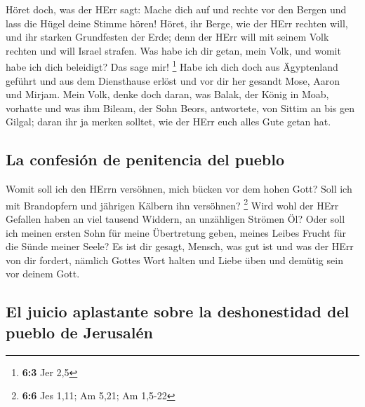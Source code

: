  Höret doch, was der HErr sagt: Mache dich auf und rechte
vor den Bergen und lass die Hügel deine Stimme hören! 
Höret, ihr Berge, wie der HErr rechten will, und ihr starken Grundfesten
der Erde; denn der HErr will mit seinem Volk rechten und will Israel
strafen.  Was habe ich dir getan, mein Volk, und womit
habe ich dich beleidigt? Das sage mir! \footnote{\textbf{6:3} Jer 2,5}
 Habe ich dich doch aus Ägyptenland geführt und aus dem
Diensthause erlöst und vor dir her gesandt Mose, Aaron und Mirjam.
 Mein Volk, denke doch daran, was Balak, der König in
Moab, vorhatte und was ihm Bileam, der Sohn Beors, antwortete, von
Sittim an bis gen Gilgal; daran ihr ja merken solltet, wie der HErr euch
alles Gute getan hat.

\hypertarget{la-confesiuxf3n-de-penitencia-del-pueblo}{%
\subsection{La confesión de penitencia del
pueblo}\label{la-confesiuxf3n-de-penitencia-del-pueblo}}

 Womit soll ich den HErrn versöhnen, mich bücken vor dem
hohen Gott? Soll ich mit Brandopfern und jährigen Kälbern ihn versöhnen?
\footnote{\textbf{6:6} Jes 1,11; Am 5,21; Am 1,5-22}  Wird
wohl der HErr Gefallen haben an viel tausend Widdern, an unzähligen
Strömen Öl? Oder soll ich meinen ersten Sohn für meine Übertretung
geben, meines Leibes Frucht für die Sünde meiner Seele? 
Es ist dir gesagt, Mensch, was gut ist und was der HErr von dir fordert,
nämlich Gottes Wort halten und Liebe üben und demütig sein vor deinem
Gott.

\hypertarget{el-juicio-aplastante-sobre-la-deshonestidad-del-pueblo-de-jerusaluxe9n}{%
\subsection{El juicio aplastante sobre la deshonestidad del pueblo de
Jerusalén}\label{el-juicio-aplastante-sobre-la-deshonestidad-del-pueblo-de-jerusaluxe9n}}

